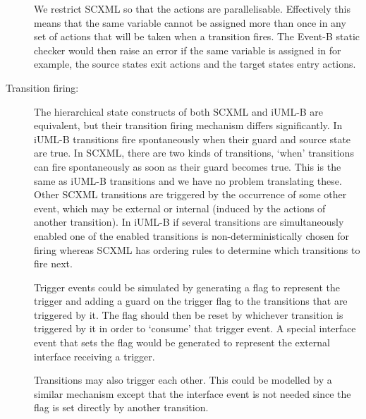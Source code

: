 \begin{description}
We restrict SCXML so that the actions are parallelisable. 
Effectively this means that the same variable cannot be 
assigned more than once in any set of actions that will be 
taken when a transition fires. The Event-B static checker 
would then raise an error if the same variable is assigned 
in for example, the source states exit actions and the 
target states entry actions. 



\item [Transition firing:]
The hierarchical state constructs of both SCXML and
iUML-B are equivalent, but their transition 
firing mechanism differs significantly. In iUML-B 
transitions fire spontaneously when their guard and source 
state are true. In SCXML, there are two kinds of transitions, 
`when' transitions can fire spontaneously as soon as their 
guard becomes true. This is the same as iUML-B transitions 
and we have no problem translating these. Other SCXML
transitions are triggered by the 
occurrence of some other event, which may be external 
or internal (induced by the actions of another transition). 
In iUML-B if several transitions are simultaneously 
enabled one of the enabled transitions is non-deterministically 
chosen for firing whereas SCXML has ordering rules to 
determine which transitions to fire next.

Trigger events could be simulated by generating a flag to 
represent the trigger and adding a guard on the trigger 
flag to the transitions that are triggered by it. The flag 
should then be reset by whichever transition is triggered 
by it in order to `consume' that trigger event. A special 
interface event that sets the flag would be generated to 
represent the external interface receiving a trigger.

Transitions may also trigger each other. This could be 
modelled by a similar mechanism except that the interface 
event is not needed since the flag is set directly by 
another transition.


\end{description}
